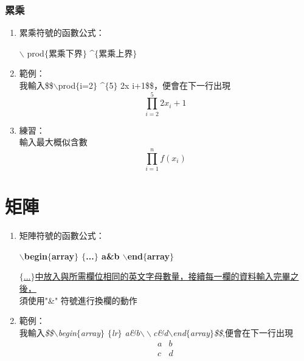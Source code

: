\subsubsection{累乘} 
\begin{enumerate}
\item 累乘符號的函數公式：\\
\begin{center}
$\backslash$ prod\textunderscore  $\{$累乘下界$\}$  \textasciicircum $\{$累乘上界$\}$
\end{center}
\item 範例：\\
我輸入\$\$$\backslash$prod\textunderscore  $\{$i=2$\}$  \textasciicircum $\{$5$\}$ 2x \textunderscore i+1\$\$，便會在下一行出現$$\prod_{i=2}^{5} 2x_{i}+1$$
\item 練習：\\
輸入最大概似含數
\begin{equation}\label{sum2}
\prod_{i=1}^{n} f(x_i)
\end{equation}
\end{enumerate}

\section{矩陣}
\begin{enumerate}
\item 矩陣符號的函數公式：\\
\begin{center}
\textbf{$\backslash$begin$\{$array$\}$ $\{$...$\}$  a\&b $\backslash$end$\{$array$\}$}
\end{center}
\underline{$\{$...$\}$中放入與所需欄位相同的英文字母數量，接續每一欄的資料輸入完畢之後，}\\
須使用"\&" 符號進行換欄的動作
\item 範例：\\
我輸入\emph{\$\$$\backslash$begin$\{$array$\}$ $\{$lr$\}$  a\&b$\backslash\backslash$c\&d$\backslash$end$\{$array$\}$\$\$},便會在下一行出現$$\begin{array}{lr} 
 a&b\\c&d
 \end{array}$$
 \end{enumerate}
